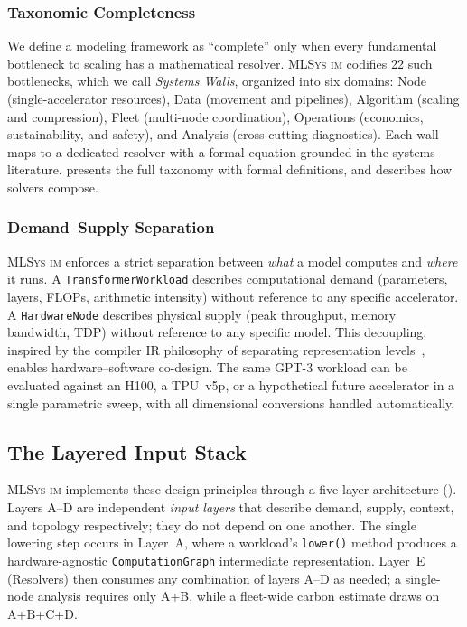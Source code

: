 \documentclass[10pt,twocolumn]{article}
\newcommand{\mlsysim}{\mbox{\textsc{MLSys}\,\textperiodcentered\,\textsc{im}}\xspace}
\begin{document}
\subsubsection{Taxonomic Completeness}
\label{sec:taxonomic}

We define a modeling framework as ``complete'' only when every fundamental bottleneck to scaling has a mathematical resolver. \mlsysim codifies 22 such bottlenecks, which we call \emph{Systems Walls}, organized into six domains: Node (single-accelerator resources), Data (movement and pipelines), Algorithm (scaling and compression), Fleet (multi-node coordination), Operations (economics, sustainability, and safety), and Analysis (cross-cutting diagnostics). Each wall maps to a dedicated resolver with a formal equation grounded in the systems literature.  presents the full taxonomy with formal definitions, and  describes how solvers compose.

\subsubsection{Demand--Supply Separation}
\label{sec:demand-supply}

\mlsysim enforces a strict separation between \emph{what} a model computes and \emph{where} it runs. A \texttt{TransformerWorkload} describes computational demand (parameters, layers, FLOPs, arithmetic intensity) without reference to any specific accelerator. A \texttt{HardwareNode} describes physical supply (peak throughput, memory bandwidth, TDP) without reference to any specific model. This decoupling, inspired by the compiler IR philosophy of separating representation levels~\citep{hennessy2024architecture}, enables hardware--software co-design. The same GPT-3 workload can be evaluated against an H100, a TPU~v5p, or a hypothetical future accelerator in a single parametric sweep, with all dimensional conversions handled automatically.

\subsection{The Layered Input Stack}
\label{sec:stack}

\mlsysim implements these design principles through a five-layer architecture (). Layers A--D are independent \emph{input layers} that describe demand, supply, context, and topology respectively; they do not depend on one another.  The single lowering step occurs in Layer~A, where a workload's \texttt{lower()} method produces a hardware-agnostic \texttt{ComputationGraph} intermediate representation.  Layer~E (Resolvers) then consumes any combination of layers A--D as needed; a single-node analysis requires only A+B, while a fleet-wide carbon estimate draws on A+B+C+D.
\end{document}
